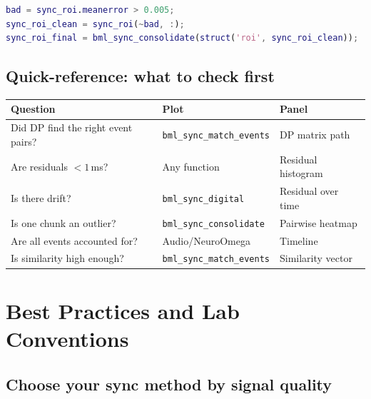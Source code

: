 \documentclass[11pt, a4paper]{article}
\begin{document}
\begin{lstlisting}[language=Matlab,caption={Removing a rogue chunk and re-consolidating}]
% Find rogue chunks (>5 ms residual)
bad = sync_roi.meanerror > 0.005;
sync_roi_clean = sync_roi(~bad, :);
sync_roi_final = bml_sync_consolidate(struct('roi', sync_roi_clean));
\end{lstlisting}

\subsection{Quick-reference: what to check first}

\begin{center}
\renewcommand{\arraystretch}{1.3}
\begin{tabular}{lll}
\toprule
\textbf{Question} & \textbf{Plot} & \textbf{Panel} \\
\midrule
Did DP find the right event pairs? & \texttt{bml\_sync\_match\_events} & DP matrix path \\
Are residuals $< 1$\,ms? & Any function & Residual histogram \\
Is there drift? & \texttt{bml\_sync\_digital} & Residual over time \\
Is one chunk an outlier? & \texttt{bml\_sync\_consolidate} & Pairwise heatmap \\
Are all events accounted for? & Audio/NeuroOmega & Timeline \\
Is similarity high enough? & \texttt{bml\_sync\_match\_events} & Similarity vector \\
\bottomrule
\end{tabular}
\end{center}

\section{Best Practices and Lab Conventions}
\label{sec:bestpractices}

\subsection{Choose your sync method by signal quality}
\end{document}
